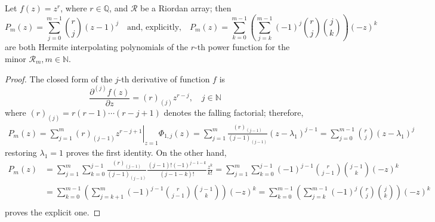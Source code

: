 
\begin{theorem}
\label{thm:pow-Hermite-interpolating-poly-implicit}
Let $f(z)=z^{r}$, where $r\in\mathbb{Q}$, and $\mathcal{R}$ be a Riordan array; then
\begin{equation}
  \label{eq:pow-Hermite-interpolating-poly}
  P_{m}(z) = \sum_{j=0}^{m-1}{\binom{r}{j}}{(z-1)^{j} }
  \quad\text{and, explicitly,}\quad
  P_{m}(z) = \sum_{k=0}^{m-1}{\left(\sum_{j=k}^{m-1}{(-1)^{j}{{r}\choose{j}}{{j}\choose{k}}}\right)(-z)^{k}}
\end{equation}
are both Hermite interpolating polynomials of the $r$-th power function for the
minor $\mathcal{R}_{m}, m\in\mathbb{N}$.
\end{theorem}

\begin{proof}
The closed form of the $j$-th derivative of function $f$ is 
$$\frac{\partial^{(j)}{f}(z)}{\partial{z}} = (r)_{(j)} z^{r-j}, \quad j\in\mathbb{N}$$ 
where $(r)_{(j)} = r(r-1)\cdots(r-j+1)$ denotes the falling factorial; therefore,
\begin{displaymath}
\begin{split}
  P_{m}(z)  = \sum_{j=1}^{m}{ \left. (r)_{(j-1)} z^{r-j+1} \right|_{z=1}\Phi_{1,j}(z)}
            = \sum_{j=1}^{m}{\frac{(r)_{(j-1)}}{(j-1)_{(j-1)}}\left(z-\lambda_{1}\right)^{j-1}}
            = \sum_{j=0}^{m-1}{{r \choose j}\left(z-\lambda_{1}\right)^{j}}
\end{split}
\end{displaymath}
restoring $\lambda_{1}=1$ proves the first identity. On the other hand,
\begin{displaymath}
\begin{split}
  P_{m}(z) &= \sum_{j=1}^{m}{\sum_{k=0}^{j-1}{\frac{(r)_{(j-1)}}{(j-1)_{(j-1)}}\frac{(j-1)!(-1)^{j-1-k}}{(j-1-k)!}\frac{z^{k}}{k!}}}
        = \sum_{j=1}^{m}{\sum_{k=0}^{j-1}{(-1)^{j-1}{{r}\choose{j-1}}{{j-1}\choose{k}}(-z)^{k}}} \\
       &= \sum_{k=0}^{m-1}{\left(\sum_{j=k+1}^{m}{(-1)^{j-1}{{r}\choose{j-1}}{{j-1}\choose{k}}}\right)(-z)^{k}}
        = \sum_{k=0}^{m-1}{\left(\sum_{j=k}^{m-1}{(-1)^{j}{{r}\choose{j}}{{j}\choose{k}}}\right)(-z)^{k}}\\
\end{split}
\end{displaymath}
proves the explicit one.
\end{proof}

